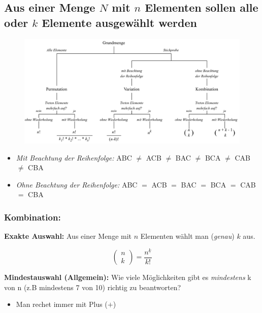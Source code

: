 \subsection{Aus einer Menge $N$ mit $n$ Elementen sollen alle oder $k$ Elemente ausgewählt werden}

\begin{figure}[h]
\includegraphics[width=1\textwidth]{graphics/komb_baum.png}
\end{figure}

{
\footnotesize
\begin{itemize}[leftmargin=*]
\item \textit{Mit Beachtung der Reihenfolge:} ABC $\not =$ ACB $\not =$ BAC $\not =$ BCA $\not =$ CAB $\not =$ CBA
\item \textit{Ohne Beachtung der Reihenfolge:} ABC $=$ ACB $=$ BAC $=$ BCA $=$ CAB $=$ CBA
\end{itemize}
}

\subsubsection*{Kombination:}

\textbf{Exakte Auswahl:} Aus einer Menge mit $n$ Elementen wählt man (\textit{genau}) $k$ aus.

$$
\begin{pmatrix}
n\\
k
\end{pmatrix} =
\frac{n^{\underline{k}}}{k!}
$$

\textbf{Mindestauswahl (Allgemein):} Wie viele Möglichkeiten gibt es \textit{mindestens} k von n (z.B mindestens 7 von 10) richtig zu beantworten?

\begin{itemize}[leftmargin=*]
\item Man rechet immer mit Plus ($+$)
\end{itemize}

